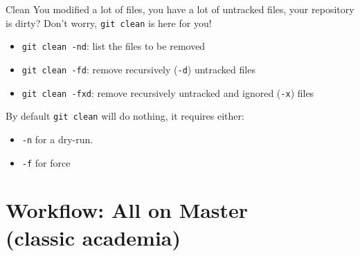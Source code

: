 \documentclass[usenames,dvipsnames,9pt]{beamer}
\begin{document}
%
\begin{frame}{Clean}
  You modified a lot of files, you have a lot of untracked files, your repository is dirty?
  Don't worry, \lstinline|git clean| is here for you!
  \begin{itemize}
    \item \lstinline|git clean -nd|: list the files to be removed
    \item \lstinline|git clean -fd|: remove recursively (\lstinline|-d|) untracked files
    \item \lstinline|git clean -fxd|: remove recursively untracked and ignored (\lstinline|-x|) files
  \end{itemize}

  \vspace{0.5cm}
  By default \lstinline|git clean| will do nothing, it requires either:
  \begin{itemize}
    \item \lstinline|-n| for a dry-run.
    \item \lstinline|-f| for force
  \end{itemize}
\end{frame}



%
%
\section{Workflow: All on Master\\(classic academia)}
\end{document}
